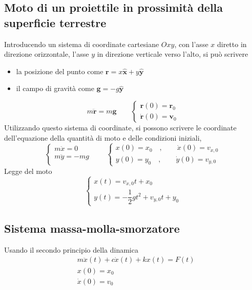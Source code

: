 \subsection{Moto di un proiettile in prossimità della superficie terrestre}
Introducendo un sistema di coordinate cartesiane $Oxy$, con l'asse $x$ diretto in direzione orizzontale, l'asse $y$ in direzione verticale verso l'alto, si può scrivere
\begin{itemize}
    \item la posizione del punto come $\mathbf{r} = x \mathbf{\hat{x}} + y \mathbf{\hat{y}}$
    \item il campo di gravità come $\mathbf{g} = -g \mathbf{\hat{y}}$
\end{itemize}
\begin{equation}
m \ddot{\mathbf{r}} = m \mathbf{g} \qquad
\begin{cases}
    \mathbf{r}(0) = \mathbf{r}_0 \\
    \dot{\mathbf{r}}(0) = \mathbf{v}_0 
\end{cases}
\end{equation}
Utilizzando questo sistema di coordinate, si possono scrivere le coordinate dell'equazione della quantità di moto e delle condizioni iniziali,
\begin{equation}
    \begin{cases}
        m \ddot{x} = 0 \\
        m \ddot{y} = -m g \\
    \end{cases} \qquad
    \begin{cases}
        x(0) = x_0 \quad , \qquad  \dot{x}(0) = v_{x,0} \\
        y(0) = y_0 \quad , \qquad  \dot{y}(0) = v_{y,0}
    \end{cases}
\end{equation}
Legge del moto
\begin{equation}
    \begin{cases}
        x(t) = v_{x,0} t + x_0 \\
        y(t) = -\dfrac{1}{2} g t^2 + v_{y,0} t + y_0
    \end{cases}
\end{equation}
\subsection{Sistema massa-molla-smorzatore}
Usando il secondo principio della dinamica
\begin{equation}
\begin{aligned}
    &  m \ddot{x}(t) + c \dot{x}(t) + k x(t) = F(t) \\
    & x(0) = x_0 \\
    & \dot{x}(0) = v_0 \\
\end{aligned}
\end{equation}
